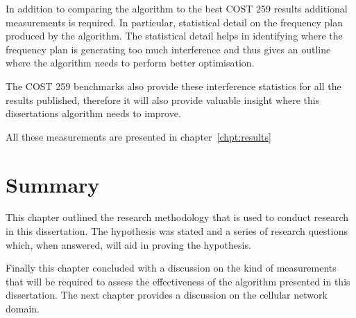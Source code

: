 In addition to comparing the algorithm to the best \gls{COST} 259 results additional measurements is required. In particular, statistical detail on the frequency plan produced by the algorithm. The statistical detail helps in identifying where the frequency plan is generating too much interference and thus gives an outline where the algorithm needs to perform better optimisation.

The \gls{COST} 259 benchmarks also provide these interference statistics for all the results published, therefore it will also provide valuable insight where this dissertations algorithm needs to improve.

All these measurements are presented in chapter~\ref{chpt:results}
\section{Summary}
This chapter outlined the research methodology that is used to conduct research in this dissertation. The hypothesis was stated and a series of research questions which, when answered, will aid in proving the hypothesis.

Finally this chapter concluded with a discussion on the kind of measurements that will be required to assess the effectiveness of the algorithm presented in this dissertation. The next chapter provides a discussion on the cellular network domain.

